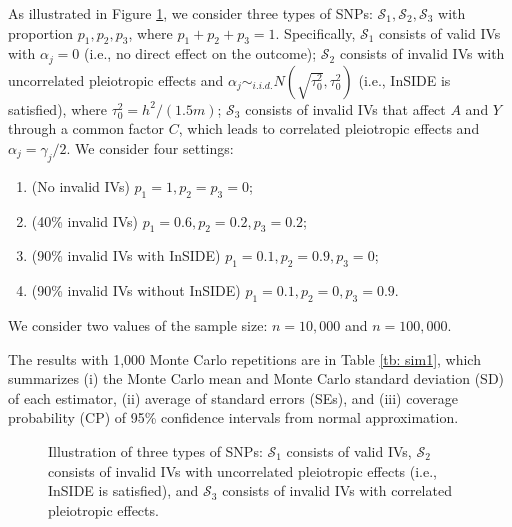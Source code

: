 \documentclass[12pt]{article}
\begin{document}
{{As illustrated in Figure \ref{fig:snps},  we consider three types of SNPs: $\mathcal{S}_1, \mathcal{S}_2, \mathcal{S}_3$ with proportion $p_1, p_2, p_3$, where $p_1+p_2+p_3=1$. Specifically, $\mathcal{S}_1$ consists of valid IVs with $\alpha_j=0$ (i.e., no direct effect on the outcome); $\mathcal{S}_2$ consists of invalid IVs with uncorrelated pleiotropic effects and $\alpha_j \sim_{i.i.d.}  N(\sqrt{\tau_0^2}, \tau_0^2) $ (i.e., InSIDE is satisfied), where $\tau_0^2 =   h^2 /(1.5m) $; $\mathcal{S}_3$ consists of invalid IVs that affect $A$ and $Y$ through a common factor $C$, which leads to correlated pleiotropic effects and $ \alpha_j = \gamma_j/2$. We consider four settings:
\begin{enumerate}
	\item (No invalid IVs) $p_1 = 1, p_2=p_3=0$;
	\item (40\% invalid IVs) $p_1 =0.6, p_2= 0.2, p_3=0.2$;
	\item  (90\% invalid IVs with InSIDE) $p_1=0.1, p_2=0.9, p_3=0$;
	\item (90\% invalid IVs without InSIDE) $p_1=0.1, p_2=0, p_3=0.9$.
\end{enumerate}
 We consider two values of the sample size: $n=10,000$ and $n=100,000$.} {\color{black}
The results with 1,000 Monte Carlo repetitions are in Table \ref{tb: sim1}, which  summarizes (i) the Monte Carlo  mean and Monte Carlo standard deviation (SD) of each estimator, (ii) average of standard errors (SEs), and (iii) coverage probability (CP) of 95\% confidence intervals from normal approximation.
}


\begin{figure}
	\centering
	\caption{Illustration of three types of SNPs: $\mathcal{S}_1$ consists of valid IVs, $\mathcal{S}_2$ consists of invalid IVs with uncorrelated pleiotropic effects (i.e., InSIDE is satisfied), and $\mathcal{S}_3$ consists of invalid IVs with correlated pleiotropic effects.}	 \label{fig:snps}
\end{figure}



}
\end{document}
